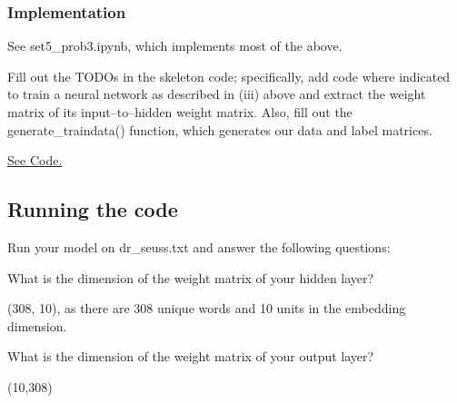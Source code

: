 \subsubsection{Implementation}

See set5_prob3.ipynb, which implements most of the above.

\problem[10]
Fill out the TODOs in the skeleton code; specifically, add code where indicated to train a neural network as described in (iii) above and extract the weight matrix of its input--to--hidden weight matrix. Also, fill out the generate\_traindata() function, which generates our data and label matrices.


\begin{solution}
	\href{https://colab.research.google.com/drive/1B-oC31wLqcr-zQsTCtJzVKTQK1y9MEal#scrollTo=h9aBEkZD5wb2}{See Code.}
\end{solution}

\subsection{Running the code}
Run your model on dr_seuss.txt and answer the following questions:

\problem[2]
What is the dimension of the weight matrix of your hidden layer?

\begin{solution}
 (308, 10), as there are 308 unique words and 10 units in the embedding dimension.
\end{solution}

\problem[2]
What is the dimension of the weight matrix of your output layer?
\begin{solution}
(10,308)
\end{solution}

